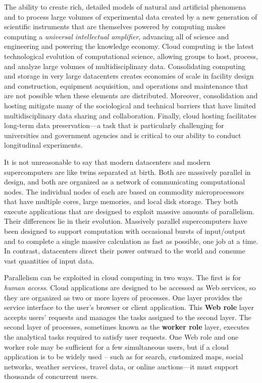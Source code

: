\documentclass[twocolumn]{article}
\begin{document}
The ability to create rich, detailed models of natural and artificial phenomena and to process large volumes of experimental data created by a new generation of scientific instruments that are themselves powered by computing makes computing a \emph{universal intellectual amplifier}, advancing all of science and engineering and powering the knowledge economy. Cloud computing is the latest technological evolution of computational science, allowing groups to host, process, and analyze large volumes of multidisciplinary data. Consolidating computing and storage in very large datacenters creates economies of scale in facility design and construction, equipment acquisition, and operations and maintenance that are not possible when these elements are distributed. Moreover, consolidation and hosting mitigate many of the sociological and technical barriers that have limited multidisciplinary data sharing and collaboration. Finally, cloud hosting facilitates long-term data preservation—a task that is particularly challenging for universities and government agencies and is critical to our ability to conduct longitudinal experiments. 

It is not unreasonable to say that modern datacenters and modern supercomputers are like twins separated at birth. Both are massively parallel in design, and both are organized as a network of communicating computational nodes. The individual nodes of each are based on commodity microprocessors that have multiple cores, large memories, and local disk storage. They both execute applications that are designed to exploit massive amounts of parallelism. Their differences lie in their evolution. Massively parallel supercomputers have been designed to support computation with occasional bursts of input/output and to complete a single massive calculation as fast as possible, one job at a time. In contrast, datacenters direct their power outward to the world and consume vast quantities of input data.

Parallelism can be exploited in cloud computing in two ways. The first is for \emph{human access}. Cloud applications are designed to be accessed as Web services, so they are organized as two or more layers of processes. One layer provides the service interface to the user’s browser or client application. This {\bfseries Web role} layer accepts users’ requests and manages the tasks assigned to the second layer. The second layer of processes, sometimes known as the {\bfseries worker role} layer, executes the analytical tasks required to satisfy user requests. One Web role and one worker role may be sufficient for a few simultaneous users, but if a cloud application is to be widely used -- such as for search, customized maps, social networks, weather services, travel data, or online auctions—it must support thousands of concurrent users.
\end{document}
